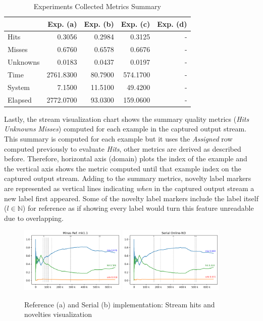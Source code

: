 \documentclass[conference]{IEEEtran}
\begin{document}
\begin{table}[h]
  \begin{center}
\caption{Experiments Collected Metrics Summary}
\begin{tabular}{l|r|r|r|r}
             &    Exp. (a) & Exp. (b) & Exp. (c) & Exp. (d)   \\\hline
             Hits     &      0.3056 &   0.2984 &   0.3125 &       -    \\\hline
    Misses   &      0.6760 &   0.6578 &   0.6676 &       -    \\\hline
    Unknowns &      0.0183 &   0.0437 &   0.0197 &       -    \\\hline
    Time     &   2761.8300 &  80.7900 & 574.1700 &       -    \\\hline
    System   &      7.1500 &  11.5100 &  49.4200 &       -    \\\hline
    Elapsed  &   2772.0700 &  93.0300 & 159.0600 &       -    
  \end{tabular}
  \label{tab:libc-matrix}
\end{center}
\end{table}

Lastly, the stream visualization chart shows the summary quality metrics
(\emph{Hits} \emph{Unknowns} \emph{Misses})
computed for each example in the captured output stream.
This summary is computed for each example but it uses the \emph{Assigned} row
computed previously to evaluate \emph{Hits}, other metrics are derived as
described before.
Therefore, horizontal axis (domain) plots the index of the example and the
vertical axis shows the metric computed until that example index on the captured
output stream.
Adding to the summary metrics, novelty label markers are represented as vertical
lines indicating \emph{when} in the captured output stream a new label first
appeared.
Some of the novelty label markers include the label itself ($l \in \mathbb{N}$)
for reference as if showing every label would turn this feature unreadable due
to overlapping.

\begin{figure}[tb]
  \centerline{
    \includegraphics[width=0.45\textwidth]{../experiments/revised-java.log.png}
    \includegraphics[width=0.45\textwidth]{../experiments/online-nd.log.png}
  }
  \caption{Reference (a) and Serial (b) implementation: Stream hits and novelties visualization}
  \label{fig:java-serial}
\end{figure}
\end{document}
